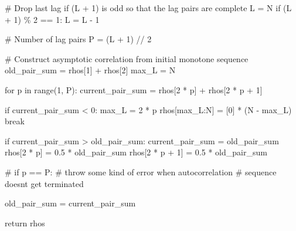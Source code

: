 \documentclass[
  letterpaper,
  DIV=11,
  numbers=noendperiod]{scrartcl}
\newenvironment{Shaded}{\begin{snugshade}}{\end{snugshade}}
\newcommand{\BuiltInTok}[1]{\textcolor[rgb]{0.00,0.23,0.31}{#1}}
\newcommand{\CommentTok}[1]{\textcolor[rgb]{0.37,0.37,0.37}{#1}}
\newcommand{\ControlFlowTok}[1]{\textcolor[rgb]{0.00,0.23,0.31}{#1}}
\newcommand{\DecValTok}[1]{\textcolor[rgb]{0.68,0.00,0.00}{#1}}
\newcommand{\FloatTok}[1]{\textcolor[rgb]{0.68,0.00,0.00}{#1}}
\newcommand{\KeywordTok}[1]{\textcolor[rgb]{0.00,0.23,0.31}{#1}}
\newcommand{\NormalTok}[1]{\textcolor[rgb]{0.00,0.23,0.31}{#1}}
\newcommand{\OperatorTok}[1]{\textcolor[rgb]{0.37,0.37,0.37}{#1}}
\begin{document}
\begin{Shaded}
\begin{Highlighting}[]
  \CommentTok{\# Drop last lag if (L + 1) is odd so that the lag pairs are complete}
\NormalTok{  L }\OperatorTok{=}\NormalTok{ N}
  \ControlFlowTok{if}\NormalTok{ (L }\OperatorTok{+} \DecValTok{1}\NormalTok{) }\OperatorTok{\%} \DecValTok{2} \OperatorTok{==} \DecValTok{1}\NormalTok{:}
\NormalTok{    L }\OperatorTok{=}\NormalTok{ L }\OperatorTok{{-}} \DecValTok{1}
  
  \CommentTok{\# Number of lag pairs}
\NormalTok{  P }\OperatorTok{=}\NormalTok{ (L }\OperatorTok{+} \DecValTok{1}\NormalTok{) }\OperatorTok{//} \DecValTok{2}
  
  \CommentTok{\# Construct asymptotic correlation from initial monotone sequence}
\NormalTok{  old\_pair\_sum }\OperatorTok{=}\NormalTok{ rhos[}\DecValTok{1}\NormalTok{] }\OperatorTok{+}\NormalTok{ rhos[}\DecValTok{2}\NormalTok{]}
\NormalTok{  max\_L }\OperatorTok{=}\NormalTok{ N}
  
  \ControlFlowTok{for}\NormalTok{ p }\KeywordTok{in} \BuiltInTok{range}\NormalTok{(}\DecValTok{1}\NormalTok{, P):}
\NormalTok{    current\_pair\_sum }\OperatorTok{=}\NormalTok{ rhos[}\DecValTok{2} \OperatorTok{*}\NormalTok{ p] }\OperatorTok{+}\NormalTok{ rhos[}\DecValTok{2} \OperatorTok{*}\NormalTok{ p }\OperatorTok{+} \DecValTok{1}\NormalTok{]}
    
    \ControlFlowTok{if}\NormalTok{ current\_pair\_sum }\OperatorTok{\textless{}} \DecValTok{0}\NormalTok{:}
\NormalTok{      max\_L }\OperatorTok{=} \DecValTok{2} \OperatorTok{*}\NormalTok{ p}
\NormalTok{      rhos[max\_L:N] }\OperatorTok{=}\NormalTok{ [}\DecValTok{0}\NormalTok{] }\OperatorTok{*}\NormalTok{ (N }\OperatorTok{{-}}\NormalTok{ max\_L)}
      \ControlFlowTok{break}
    
    \ControlFlowTok{if}\NormalTok{ current\_pair\_sum }\OperatorTok{\textgreater{}}\NormalTok{ old\_pair\_sum:}
\NormalTok{      current\_pair\_sum }\OperatorTok{=}\NormalTok{ old\_pair\_sum}
\NormalTok{      rhos[}\DecValTok{2} \OperatorTok{*}\NormalTok{ p]     }\OperatorTok{=} \FloatTok{0.5} \OperatorTok{*}\NormalTok{ old\_pair\_sum}
\NormalTok{      rhos[}\DecValTok{2} \OperatorTok{*}\NormalTok{ p }\OperatorTok{+} \DecValTok{1}\NormalTok{] }\OperatorTok{=} \FloatTok{0.5} \OperatorTok{*}\NormalTok{ old\_pair\_sum}
    
    \CommentTok{\# if p == P:}
      \CommentTok{\# throw some kind of error when autocorrelation}
      \CommentTok{\# sequence doesn\textquotesingle{}t get terminated}
    
\NormalTok{    old\_pair\_sum }\OperatorTok{=}\NormalTok{ current\_pair\_sum}
  
  \ControlFlowTok{return}\NormalTok{ rhos}
\end{Highlighting}
\end{Shaded}
\end{document}
